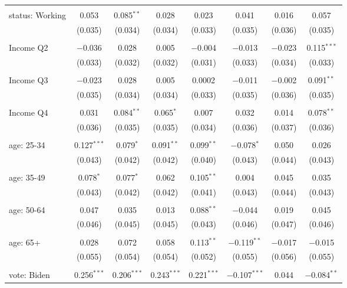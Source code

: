 \begin{tabular}{@{\extracolsep{5pt}}lccccccc}
  & & & & & & & \\ 
 status: Working & 0.053 & 0.085$^{**}$ & 0.028 & 0.023 & 0.041 & 0.016 & 0.057 \\ 
  & (0.035) & (0.034) & (0.034) & (0.033) & (0.035) & (0.036) & (0.035) \\ 
  & & & & & & & \\ 
 Income Q2 & $-$0.036 & 0.028 & 0.005 & $-$0.004 & $-$0.013 & $-$0.023 & 0.115$^{***}$ \\ 
  & (0.033) & (0.032) & (0.032) & (0.031) & (0.033) & (0.034) & (0.033) \\ 
  & & & & & & & \\ 
 Income Q3 & $-$0.023 & 0.028 & 0.005 & 0.0002 & $-$0.011 & $-$0.002 & 0.091$^{**}$ \\ 
  & (0.035) & (0.034) & (0.034) & (0.033) & (0.035) & (0.036) & (0.035) \\ 
  & & & & & & & \\ 
 Income Q4 & 0.031 & 0.084$^{**}$ & 0.065$^{*}$ & 0.007 & 0.032 & 0.014 & 0.078$^{**}$ \\ 
  & (0.036) & (0.035) & (0.035) & (0.034) & (0.036) & (0.037) & (0.036) \\ 
  & & & & & & & \\ 
 age: 25-34 & 0.127$^{***}$ & 0.079$^{*}$ & 0.091$^{**}$ & 0.099$^{**}$ & $-$0.078$^{*}$ & 0.050 & 0.026 \\ 
  & (0.043) & (0.042) & (0.042) & (0.040) & (0.043) & (0.044) & (0.043) \\ 
  & & & & & & & \\ 
 age: 35-49 & 0.078$^{*}$ & 0.077$^{*}$ & 0.062 & 0.105$^{**}$ & 0.004 & 0.045 & 0.035 \\ 
  & (0.043) & (0.042) & (0.042) & (0.041) & (0.043) & (0.044) & (0.043) \\ 
  & & & & & & & \\ 
 age: 50-64 & 0.047 & 0.035 & 0.013 & 0.088$^{**}$ & $-$0.044 & 0.019 & 0.045 \\ 
  & (0.046) & (0.045) & (0.045) & (0.043) & (0.046) & (0.047) & (0.046) \\ 
  & & & & & & & \\ 
 age: 65+ & 0.028 & 0.072 & 0.058 & 0.113$^{**}$ & $-$0.119$^{**}$ & $-$0.017 & $-$0.015 \\ 
  & (0.055) & (0.054) & (0.054) & (0.052) & (0.055) & (0.056) & (0.055) \\ 
  & & & & & & & \\ 
 vote: Biden & 0.256$^{***}$ & 0.206$^{***}$ & 0.243$^{***}$ & 0.221$^{***}$ & $-$0.107$^{***}$ & 0.044 & $-$0.084$^{**}$ \\ 

\end{tabular}
